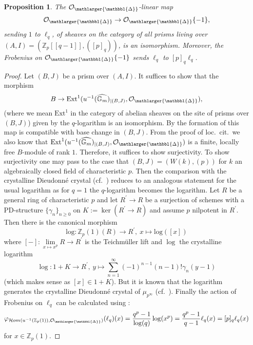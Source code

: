 \documentclass{amsart}
\newcommand{\prism}{{\mathlarger{\mathbbl{\Delta}}}}
\theoremstyle{plain}
\newtheorem{proposition}[theorem]{Proposition}
\theoremstyle{definition}
\newcommand{\Gm}{{\mathbb{G}_m}}
\newcommand{\Z}{\mathbb{Z}}
\newcommand{\red}[1]{{\color{black} #1}}
\begin{document}
\begin{proposition}
  \label{sec:prism-dieud-modul-proposition-prismatic-dieudonne-module-of-mu-p-infty} 
  The $\mathcal{O}_\prism$-linear map
  $$
  \mathcal{O}_{\prism} \to \mathcal{O}_{\prism}\{-1\}, 
    $$
  sending $1$ to $\ell_q$, of sheaves on the category of all prisms living over $(A,I)=(\Z_p[[q-1]],([p]_q))$, is an isomorphism. Moreover, the Frobenius on $\mathcal{O}_{\prism}\{-1\}$ sends $\ell_q$ to $[p]_q\ell_q$. 
\end{proposition}
\begin{proof}
Let $(B,J)$ be a prism over $(A,I)$. It suffices to show that the morphism
  $$
  B \to \mathrm{Ext}^1(u^{-1}(\widehat{\Gm})_{|(B,J)},\mathcal{O}_\prism),
  $$
  (where we mean $\mathrm{Ext}^1$ in the category of abelian sheaves on the site of prisms over $(B,J)$) given by the $q$-logarithm is an isomorphism. By  the formation of this map is compatible with base change in $(B,J)$. \red{From the proof of loc.\ cit.\ we also know that $\mathrm{Ext}^1(u^{-1}(\widehat{\Gm})_{|(B,J)},\mathcal{O}_\prism)$ is a finite, locally free $B$-module of rank $1$. Therefore, it suffices to show surjectivity.} To show surjectivity one may pass to the case that $(B,J)=(W(k),(p))$ for $k$ an algebraically closed field of characteristic $p$. Then the comparison with the crystalline Dieudonn\'e crystal (cf.\ ) reduces to an analogous statement for the usual logarithm as for $q=1$ the $q$-logarithm becomes the logarithm. Let $R$ be a general ring of characteristic $p$ and let $R^\prime\to R$ be a surjection of schemes with a PD-structure $\{\gamma_{n}\}_{n\geq 0}$ on $K:=\ker(R^\prime\to R)$ and assume $p$ nilpotent in $R^\prime$. Then there is the canonical morphism
  $$
  \mathrm{log}\colon \Z_p(1)(R)\to R^\prime,\ x\mapsto \mathrm{log}([x])
  $$
  where $[-]\colon \lim\limits_{x\mapsto x^p} R\to R^\prime$ is the
  Teichm\"uller lift and $\log$ the crystalline logarithm
  $$
  \log\colon 1+K\to R^\prime,\ y\mapsto
  \sum\limits_{n=1}^\infty(-1)^{n-1}(n-1)! \gamma_n(y-1)
  $$
  (which makes sense as $[x]\in 1+K$). But it is known that the logarithm generates the crystalline Dieudonn\'e crystal of $\mu_{p^\infty}$ (cf.\ \cite[2.2.3.Corollaire]{berthelot_messing_theorie_de_dieudonne_cristalline_III}).
  Finally the action of Frobenius on $\ell_q$ can be calculated using :
  $$
  \varphi_{\mathcal{H}om(u^{-1}(\Z_p(1)),\mathcal{O}_\prism)}(\ell_q)(x)=\frac{q^p-1}{\log(q)}\log(x^p)=\frac{q^p-1}{q-1}\ell_q(x)=[p]_q\ell_q(x)
  $$
  for $x\in \Z_p(1)$.


\end{proof}
\end{document}
